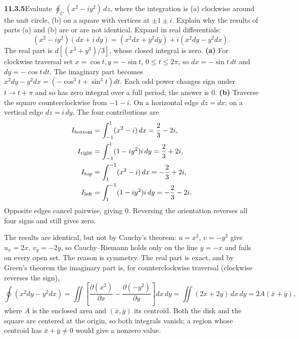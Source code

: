 \par\bigskip
\noindent\textbf{11.3.5}\quad Evaluate $\displaystyle\oint_{C}(x^{2}-iy^{2})\,dz$,
where the integration is (a) clockwise around the unit circle, (b) on a square
with vertices at $\pm1\pm i$. Explain why the results of parts (a) and (b) are
or are not identical.
\solution
Expand in real differentials:
\[
(x^2-iy^2)(dx+i\,dy)
=(x^2dx+y^2dy)+i(x^2dy-y^2dx).
\]
The real part is $d[(x^3+y^3)/3]$, whose closed integral is zero.
\textbf{(a)} For clockwise traversal set
$x=\cos t,y=-\sin t$, $0\le t\le2\pi$, so $dx=-\sin t\,dt$ and
$dy=-\cos t\,dt$. The imaginary part becomes
$x^2dy-y^2dx=(-\cos^3t+\sin^3t)dt$.
Each odd power changes sign under $t\to t+\pi$ and so has zero
integral over a full period; the answer is $0$.
\textbf{(b)} Traverse the square counterclockwise from $-1-i$.
On a horizontal edge $dz=dx$; on a vertical edge $dz=i\,dy$.
The four contributions are
\[
\begin{aligned}
I_{\rm bottom}&=\int_{-1}^{1}(x^2-i)\,dx=\frac23-2i,\\
I_{\rm right}&=\int_{-1}^{1}(1-iy^2)i\,dy=\frac23+2i,\\
I_{\rm top}&=\int_{1}^{-1}(x^2-i)\,dx=-\frac23+2i,\\
I_{\rm left}&=\int_{1}^{-1}(1-iy^2)i\,dy=-\frac23-2i.
\end{aligned}
\]
Opposite edges cancel pairwise, giving $\boxed0$. Reversing the
orientation reverses all four signs and still gives zero.

The results are identical, but not by Cauchy's theorem: $u=x^2$,
$v=-y^2$ give $u_x=2x$, $v_y=-2y$, so Cauchy--Riemann holds only on
the line $y=-x$ and fails on every open set. The reason is symmetry.
The real part is exact, and by Green's theorem the imaginary part is,
for counterclockwise traversal (clockwise reverses the sign),
\[
\oint(x^2dy-y^2dx)=\iint\left[\frac{\partial(x^2)}{\partial x}
-\frac{\partial(-y^2)}{\partial y}\right]dx\,dy
=\iint(2x+2y)\,dx\,dy=2A(\bar x+\bar y),
\]
where $A$ is the enclosed area and $(\bar x,\bar y)$ its centroid.
Both the disk and the square are centered at the origin, so both
integrals vanish; a region whose centroid has $\bar x+\bar y\ne0$
would give a nonzero value.

